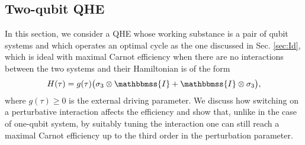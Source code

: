 \documentclass[aps,pra,floatfix,twocolumn,groupedaddress,superscriptaddress,nofootinbib,notitlepage,amsmath,amssymb,]{revtex4-1}
\begin{document}
\subsection{Two-qubit QHE}

In this section, we consider a QHE whose working substance is a pair of qubit systems and which operates an optimal cycle as the one discussed in Sec. \ref{sec:Id}, which is ideal with maximal Carnot efficiency when there are no interactions between the two systems and their Hamiltonian is of the form
\begin{equation}
\label{2qfree}
H(\tau)=g(\tau)\big(\sigma_3\otimes \mathbbmss{I}+\mathbbmss{I}\otimes\sigma_3\big),
\end{equation}
where $g(\tau)\geqslant 0$ is the external driving parameter.
We discuss how switching on a perturbative interaction affects the efficiency and show that, unlike in the case of one-qubit system, by suitably tuning the interaction one can still reach a maximal Carnot efficiency up to the third order in the perturbation parameter. 
\end{document}
